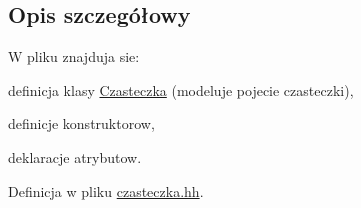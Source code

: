 \subsection{Opis szczegółowy}
W pliku znajduja sie\-:
\begin{DoxyItemize}
\item definicja klasy \hyperlink{class_czasteczka}{Czasteczka} (modeluje pojecie czasteczki),
\item definicje konstruktorow,
\item deklaracje atrybutow. 
\end{DoxyItemize}

Definicja w pliku \hyperlink{czasteczka_8hh_source}{czasteczka.\-hh}.

